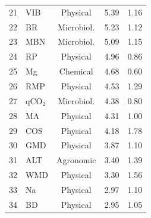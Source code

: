 \documentclass[12pt]{article}
\begin{document}
\begin{table}[ht]
\begin{tabular}{rlccc}
21 & VIB   & Physical     & 5.39 & 1.16 \\
22 & BR    & Microbiol.   & 5.23 & 1.12 \\
23 & MBN   & Microbiol.   & 5.09 & 1.15 \\
24 & RP    & Physical     & 4.96 & 0.86 \\
25 & Mg    & Chemical     & 4.68 & 0.60 \\
26 & RMP   & Physical     & 4.53 & 1.29 \\
27 & qCO$_2$  & Microbiol. & 4.38 & 0.80 \\
28 & MA    & Physical     & 4.31 & 1.00 \\
29 & COS   & Physical     & 4.18 & 1.78 \\
30 & GMD   & Physical     & 3.87 & 1.10 \\
31 & ALT   & Agronomic    & 3.40 & 1.39 \\
32 & WMD   & Physical     & 3.30 & 1.56 \\
33 & Na    & Physical     & 2.97 & 1.10 \\
34 & BD    & Physical     & 2.95 & 1.05 \\
\bottomrule
\end{tabular}
\smallskip

\end{table}
\end{document}
